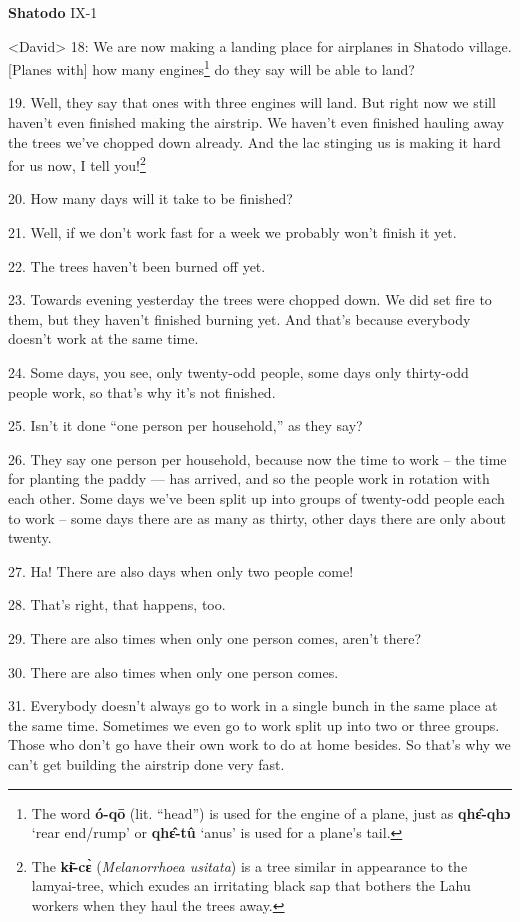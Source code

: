 \setcounter{footnote}{0}

\textbf{Shatodo} IX-1

<David> 18: We are now making a landing place for airplanes in
Shatodo village. [Planes with] how many engines\footnote{The word \textbf{ó-qō} (lit. ``head'') is used for the engine of a plane, just as \textbf{qhɛ̂-qhɔ} `rear end/rump' or \textbf{qhɛ̂-tû} `anus' is used for a plane's tail.} do they say will be able to
land?

19. Well, they say that ones with three engines will land. But right now we still
haven't even finished making the airstrip. We haven't even finished hauling away
the trees we've chopped down already. And the lac stinging us is making it hard
for us now, I tell you!\footnote{The \textbf{kɨ̄-cɛ̀} (\textit{Melanorrhoea usitata}) is a tree similar in appearance to the lamyai-tree, which exudes an irritating black sap that bothers the Lahu workers when they haul the trees away.}

20. How many days will it take to be finished?

21. Well, if we don't work fast for a week we probably won't finish it yet.

22. The trees haven't been burned off yet.

23. Towards evening yesterday the trees were chopped down. We did set fire to them,
but they haven't finished burning yet. And that's because everybody doesn't work
at the same time.

24. Some days, you see, only twenty-odd people, some days only thirty-odd people
work, so that's why it's not finished.

25. Isn't it done ``one person per household,'' as they say?

26. They say one person per household, because now the time to work -- the time
for planting the paddy --- has arrived, and so the people work in rotation with
each other. Some days we've been split up into groups of twenty-odd people each
to work -- some days there are as many as thirty, other days there are only about
twenty.

27. Ha! There are also days when only two people come!

28. That's right, that happens, too.

29. There are also times when only one person comes, aren't there?

30. There are also times when only one person comes.

31. Everybody doesn't always go to work in a single bunch in the same place at
the same time. Sometimes we even go to work split up into two or three groups.
Those who don't go have their own work to do at home besides. So that's why we
can't get building the airstrip done very fast.

